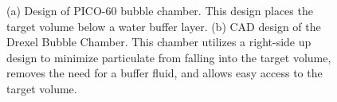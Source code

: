 \documentclass[%
12pt,
twoside,
reprint,
amsmath,amssymb,
aps,
]{article}
\begin{document}
	\begin{figure}
		\centering
		\qquad
		\caption{\label{tab:table-name} (a) Design of PICO-60 bubble chamber. This design places the target volume below a water buffer layer. (b) CAD design of the Drexel Bubble Chamber. This chamber utilizes a right-side up design to minimize particulate from falling into the target volume, removes the need for a buffer fluid, and allows easy access to the target volume.}%
	\end{figure}
	
\end{document}
